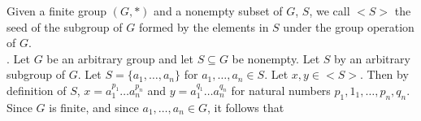 \documentclass{article}
\begin{document}
 Given a finite group $(G,*)$ and a nonempty subset of $G$, $S$, we call $<S>$ the seed of the subgroup of $G$ formed by the elements in $S$ under the group operation of $G$. \\
. Let $G$ be an arbitrary group and let $S\subseteq G$ be nonempty. Let $S$ by an arbitrary subgroup of $G$. Let $S = \{a_1,\dots,a_n\}$ for $a_1,\dots,a_n\in S$. Let $x,y\in <S>$. Then by definition of $S$, $x = a_1^{p_1}\dots a_n^{p_n}$ and $y = a_1^{q_1}\dots a_n^{q_n}$ for natural numbers $p_1,1_1,\dots,p_n,q_n$. Since $G$ is finite, and since $a_1,\dots,a_n \in G$, it follows that 
\end{document}

